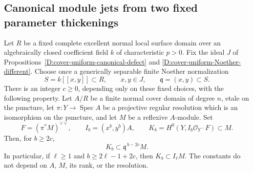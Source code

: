 \subsection{Canonical module jets from two fixed parameter thickenings}

\begin{lemma}
\label{D:canonical-pullback-uniform-jet-loss}
Let $R$ be a fixed complete excellent normal local surface domain
over an algebraically closed coefficient field $k$ of characteristic
$p>0$. Fix the ideal $J$ of
Propositions~\ref{D:cover-uniform-canonical-defect} and
\ref{D:cover-uniform-Noether-different}. Choose once a generically
separable finite Noether normalization
\[
 S=k[[x,y]]\subset R,\qquad x,y\in J,
 \qquad \mathfrak q=(x,y)\subset S.
                                                        \tag{D.CJ.1}
\]
There is an integer $c\ge0$, depending only on these fixed choices,
with the following property. Let $A/R$ be a finite normal cover domain
of degree $n$, etale on the puncture, let
$\pi:Y\to\operatorname{Spec}A$ be a projective regular resolution
which is an isomorphism on the puncture, and let $M$ be a reflexive
$A$-module. Set
\[
 F=(\pi^*M)^{\vee\vee},\qquad I_b=(x^b,y^b)A,
 \qquad K_b=H^0(Y,I_b\mathcal O_Y\cdot F)\subset M.
\]
Then, for $b\ge2c$,
\[
                 K_b\subset\mathfrak q^{\,b-2c}M.
                                                        \tag{D.CJ.2}
\]
In particular, if $\ell\ge1$ and $b\ge2\ell-1+2c$, then
$K_b\subset I_\ell M$. The constants do not depend on $A$, $M$,
its rank, or the resolution.
\end{lemma}


